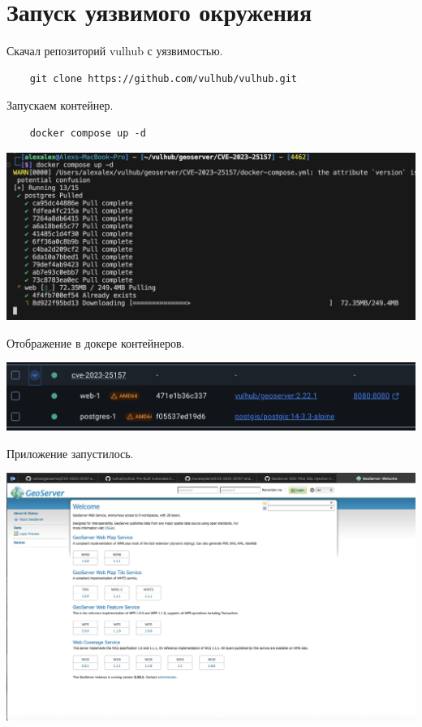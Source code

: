 \documentclass{article}
\begin{document}
\section{Запуск уязвимого окружения}

Скачал репозиторий vulhub с уязвимостью.
\begin{lstlisting}
    git clone https://github.com/vulhub/vulhub.git
\end{lstlisting}
Запускаем контейнер.
\begin{lstlisting}
    docker compose up -d
\end{lstlisting}
\begin{center}
  \includegraphics[width=.9\textwidth]{docker.png}
\end{center}
Отображение в докере контейнеров.
\begin{center}
  \includegraphics[width=.9\textwidth]{up.png}
\end{center}
Приложение запустилось.
\begin{center}
  \includegraphics[width=.9\textwidth]{geos.png}
\end{center}
\end{document}
